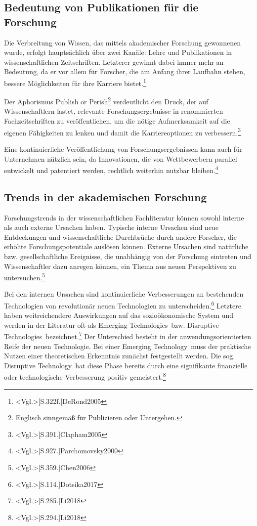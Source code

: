 \subsection{Bedeutung von Publikationen für die Forschung}
Die Verbreitung von Wissen, das mittels akademischer Forschung gewonnenen wurde, erfolgt hauptsächlich über zwei Kanäle: Lehre und Publikationen in wissenschaftlichen Zeitschriften. Letzterer gewinnt dabei immer mehr an Bedeutung, da er vor allem für Forscher, die am Anfang ihrer Laufbahn stehen, bessere Möglichkeiten für ihre Karriere bietet.\footnote{\citeNP<Vgl.>[S.322f.]{DeRond2005}}

Der Aphorismus \glqq Publish or Perish\grqq\footnote{Englisch sinngemäß für \glqq Publizieren oder Untergehen\grqq.} verdeutlicht den Druck, der auf Wissenschaftlern lastet, relevante Forschungsergebnisse in renommierten Fachzeitschriften zu veröffentlichen, um die nötige Aufmerksamkeit auf die eigenen Fähigkeiten zu lenken und damit die Karriereoptionen zu verbessern.\footnote{\citeNP<Vgl.>[S.391.]{Clapham2005}}

Eine kontinuierliche Veröffentlichung von Forschungsergebnissen kann auch für Unternehmen nützlich sein, da Innovationen, die von Wettbewerbern parallel entwickelt und patentiert werden, rechtlich weiterhin nutzbar bleiben.\footnote{\citeNP<Vgl.>[S.927.]{Parchomovsky2000}}

\subsection{Trends in der akademischen Forschung}
Forschungstrends in der wissenschaftlichen Fachliteratur können sowohl interne als auch externe Ursachen haben. Typische interne Ursachen sind neue Entdeckungen und wissenschaftliche Durchbrüche durch andere Forscher, die erhöhte Forschungspotentiale auslösen können. Externe Ursachen sind natürliche bzw. gesellschaftliche Ereignisse, die unabhängig von der Forschung eintreten und Wissenschaftler dazu anregen können, ein Thema aus neuen Perspektiven zu untersuchen.\footnote{\citeNP<Vgl.>[S.359.]{Chen2006}}

Bei den internen Ursachen sind kontinuierliche Verbesserungen an bestehenden Technologien von revolutionär neuen Technologien zu unterscheiden.\footnote{\citeNP<Vgl.>[S.114.]{Dotsika2017}} Letztere haben weitreichendere Auswirkungen auf das sozioökonomische System und werden in der Literatur oft als \glqq Emerging Technologies\grqq~bzw. \glqq Disruptive Technologies\grqq~bezeichnet.\footnote{\citeNP<Vgl.>[S.285.]{Li2018}} Der Unterschied besteht in der anwendungsorientierten Reife der neuen Technologie. Bei einer \glqq Emerging Technology\grqq~muss der praktische Nutzen einer theoretischen Erkenntnis zunächst festgestellt werden. Die sog. \glqq Disruptive Technology\grqq~hat diese Phase bereits durch eine signifikante finanzielle oder technologische Verbesserung positiv gemeistert.\footnote{\citeNP<Vgl.>[S.294.]{Li2018}}

